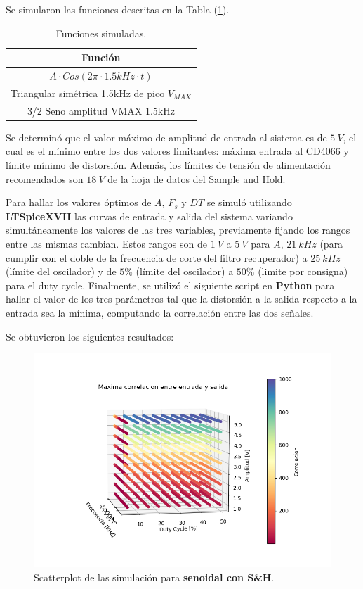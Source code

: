 Se simularon las funciones descritas en la Tabla (\ref{fn}).
\begin{table}[H]
\centering
\begin{tabular}{@{}c@{}}
\toprule
Función \\ \midrule
$A\cdot Cos(2\pi \cdot 1.5kHz \cdot t)$ \\
Triangular simétrica 1.5kHz de pico $V_{MAX}$ \\
3/2 Seno amplitud VMAX 1.5kHz \\ \bottomrule
\end{tabular}
\caption{Funciones simuladas.}
\label{fn}
\end{table}

Se determinó que el valor máximo de amplitud de entrada al sistema es de $5 \ V$, el cual es el mínimo entre los dos valores limitantes: máxima entrada al CD4066 y límite mínimo de distorsión. Además, los límites de tensión de alimentación recomendados son $18 \ V$ de la hoja de datos del Sample and Hold.

Para hallar los valores óptimos de $A$, $F_s$ y $DT$ se simuló utilizando \textbf{LTSpiceXVII} las curvas de entrada y salida del sistema variando simultáneamente los valores de las tres variables, previamente fijando los rangos entre las mismas cambian. Estos rangos son de $1 \ V$ a $5 \ V$ para $A$, $21 \ kHz$ (para cumplir con el doble de la frecuencia de corte del filtro recuperador) a $25 \ kHz$ (límite del oscilador) y de $5\%$ (límite del oscilador) a $50\%$ (limite por consigna) para el duty cycle. Finalmente, se utilizó el siguiente script en \textbf{Python} para hallar el valor de los tres parámetros tal que la distorsión a la salida respecto a la entrada sea la mínima, computando la correlación entre las dos señales.
\begin{figure}[H]
\centering
\scalebox{0.75}{}
\end{figure}

Se obtuvieron los siguientes resultados:
\begin{figure}[H]
\centering
	\includegraphics[width=0.8\linewidth]{ImagenesEjercicio6/scatter_sh_seno.png}
	\caption{Scatterplot de las simulación para \textbf{senoidal con S\&H}.}
	\label{seno_sh}
\end{figure}

